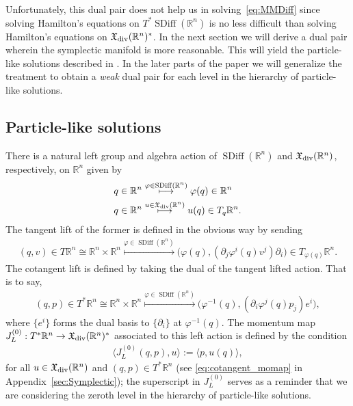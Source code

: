 \documentclass[12pt]{amsart}
\newcommand{\R}{\ensuremath{\mathbb{R}}}
\DeclareMathOperator{\SDiff}{SDiff}
\begin{document}
Unfortunately, this dual pair does not help us in solving~\eqref{eq:MMDiff}
since solving Hamilton's equations on $T^*\SDiff(\R^n)$ is no less difficult
than solving Hamilton's equations on $\mathfrak{X}_{\rm div}(\R^n)^*$.
In the next section we will derive a dual pair wherein the symplectic
manifold is more reasonable.
This will yield the particle-like solutions described in \cite{MumfordMichor2013}. In the later parts of the paper we will generalize the treatment to obtain a \emph{weak} dual pair for each level in the hierarchy of particle-like solutions.

\subsection{Particle-like solutions}
\label{sec:zeroth_order}
There is a natural left group and algebra action of $\SDiff(\R^n)$
and $\mathfrak{X}_{\rm div}(\R^n)$, respectively, on $\R^n$ given by
\begin{align*}
  q \in \R^n
  &\stackrel{ \varphi \in \SDiff(\R^n) }{\longmapsto}
  \varphi(q) \in \R^n \\
  q \in \R^n
  &\stackrel{ u \in \mathfrak{X}_{\rm div}(\R^n) }{\longmapsto}
  u(q) \in T_q\R^n.
\end{align*}
The tangent lift of the former is defined in the obvious way by sending
\begin{align*}
  (q,v) \in T\R^n \cong \R^n \times \R^n
  \stackrel{ \varphi \in \SDiff(\R^n) }{\longmapsto}
  \big(\varphi(q) , (\partial_j\varphi^i(q) v^j) \partial_i \big) \in T_{\varphi(q)} \R^n.
\end{align*}
The cotangent lift is defined by taking the dual
of  the tangent lifted action.
That is to say,
\begin{align*}
  (q, p) \in T^*\R^n \cong \R^n \times \R^n
  \stackrel{ \varphi \in \SDiff(\R^n) }{\longmapsto}
  \big(\varphi^{-1}(q) , (\partial_i\varphi^j(q) p_j) e^i \big),
\end{align*}
where $\{e^i\}$ forms the dual basis to $\{\partial_i\}$ at $\varphi^{-1}(q)$.
The momentum map
$J^{(0)}_L : T^*\R^n \to \mathfrak{X}_{\rm div}(\R^n)^*$
associated to this left action is defined by the
condition
\begin{align*}
  \langle J_L^{(0)}( q , p) , u \rangle := \langle p , u(q) \rangle,
\end{align*}
for all $u \in \mathfrak{X}_{\rm div}(\R^n)$ and $(q,p) \in T^*\R^n$ (see \eqref{eq:cotangent_momap} in Appendix~\ref{sec:Symplectic}); the superscript in $J_L^{(0)}$ serves as a reminder that we are considering the zeroth level in the hierarchy of particle-like solutions.
\end{document}
